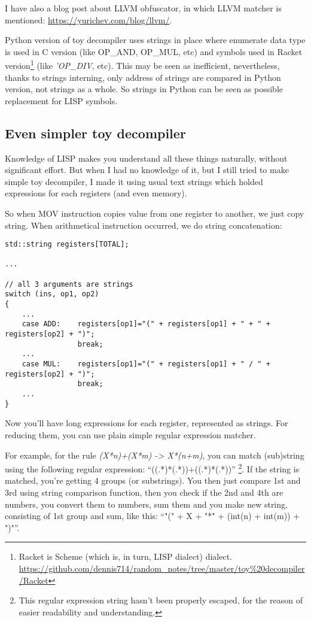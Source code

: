 ﻿\documentclass[12pt]{article}
\begin{document}
I have also a blog post about LLVM obfuscator, in which LLVM matcher is mentioned: \url{https://yurichev.com/blog/llvm/}.

Python version of toy decompiler uses strings in place where enumerate data type is used in C version
(like OP\_AND, OP\_MUL, etc) and
symbols used in Racket version\footnote{Racket is Scheme (which is, in turn, LISP dialect) dialect.
\url{https://github.com/dennis714/random_notes/tree/master/toy\%20decompiler/Racket}} (like \textit{'OP\_DIV}, etc).
This may be seen as inefficient, nevertheless, thanks to strings interning, only address of strings are compared in
Python version, not strings as a whole. So strings in Python can be seen as possible replacement for LISP symbols.

\subsection{Even simpler toy decompiler}

Knowledge of LISP makes you understand all these things naturally, without significant effort.
But when I had no knowledge of it, but I still tried to make simple toy decompiler, I made it using usual text strings
which holded expressions for each registers (and even memory).

So when MOV instruction copies value from one register to another, we just copy string.
When arithmetical instruction occurred, we do string concatenation:

\begin{lstlisting}
std::string registers[TOTAL];

...

// all 3 arguments are strings
switch (ins, op1, op2)
{
    ...
    case ADD:    registers[op1]="(" + registers[op1] + " + " + registers[op2] + ")";
                 break;
    ...
    case MUL:    registers[op1]="(" + registers[op1] + " / " + registers[op2] + ")";
                 break;
    ...
}
\end{lstlisting}

Now you'll have long expressions for each register, represented as strings.
For reducing them, you can use plain simple regular expression matcher.

For example, for the rule \textit{(X*n)+(X*m) -> X*(n+m)}, you can match (sub)string using the following
regular expression: ``((.*)*(.*))+((.*)*(.*))''
\footnote{This regular expression string hasn't been properly escaped,
for the reason of easier readability and understanding.}.
If the string is matched, you're getting 4 groups (or substrings).
You then just compare 1st and 3rd using string comparison function, then you check if
the 2nd and 4th are numbers, you convert them to numbers, sum them and you make new string, consisting
of 1st group and sum, like this: ``"(" + X + "*" + (int(n) + int(m)) + ")"''.
\end{document}
